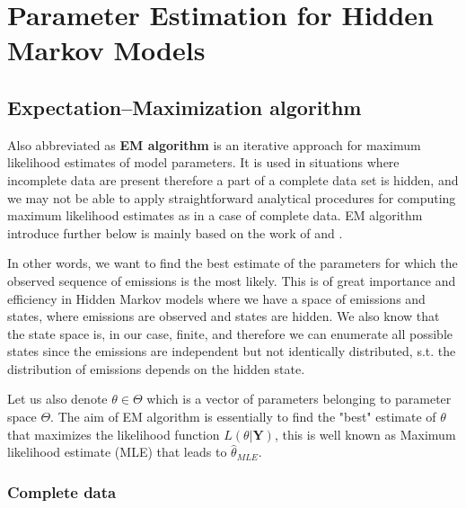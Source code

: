 
\chapter{Parameter Estimation for Hidden Markov Models}

\ifpdf
    \graphicspath{{Chapter2/Figs/Raster/}{Chapter2/Figs/PDF/}{Chapter2/Figs/}}
\else
    \graphicspath{{Chapter2/Figs/Vector/}{Chapter2/Figs/}}
\fi

\section{ Expectation–Maximization algorithm}
 
Also abbreviated as \textbf{EM algorithm} is an iterative approach for maximum likelihood estimates of model parameters. 
It is used in situations where incomplete data are present therefore a part of a complete data set is hidden, 
and we may not be able to apply straightforward analytical procedures for computing maximum likelihood estimates as in a 
case of complete data. EM algorithm introduce further below is mainly based on the work of \citep{Dempster1977} and \citep{McLachlan2008}.

In other words, we want to find the best estimate of the parameters for which the observed sequence of emissions is the most likely. 
This is of great importance and efficiency in Hidden Markov models where we have a space of emissions and states, where  emissions 
are observed and states are hidden. We also know that the state space is, in our case, finite, and therefore we can enumerate all possible states 
since the emissions are independent but not identically distributed, s.t. the distribution of emissions depends on the hidden state.

Let us also denote $\theta \in \Theta$ which is a vector of parameters belonging to parameter space $\Theta$. 
The aim of EM algorithm is essentially to find the "best" estimate of $\theta$ that maximizes the likelihood function $L(\theta|\textbf{Y})$, 
this is well known as Maximum likelihood estimate (MLE) that leads to $\hat{\theta}_{MLE}$. 

\subsection*{Complete data}

